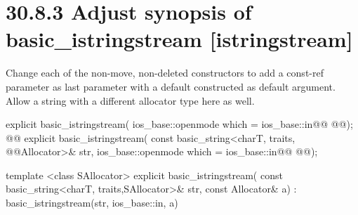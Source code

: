 \documentclass[ebook,11pt,article]{memoir}
\begin{document}
\section{30.8.3 Adjust synopsis of basic\_istringstream [istringstream]}
Change each of the non-move, non-deleted constructors to add a const-ref  parameter as last parameter with a default constructed  as default argument. Allow a string with a different allocator type here as well.
\begin{codeblock}
explicit basic_istringstream(
             ios_base::openmode which = ios_base::in@\added{,}@
             @@);
@@
explicit basic_istringstream(
             const basic_string<charT, traits, @@Allocator>& str,
             ios_base::openmode which = ios_base::in@\added{,}@
             @@);
\end{codeblock}
\begin{addedblock}\begin{codeblock}
template <class SAllocator>
explicit basic_istringstream(
             const basic_string<charT, traits,SAllocator>& str,
             const Allocator& a)
         : basic_istringstream(str, ios_base::in, a) {}
\end{codeblock}\end{addedblock}


%
\end{document}
